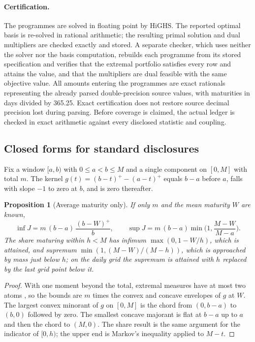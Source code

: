 \documentclass[11pt,a4paper]{article}
\newtheorem{proposition}{Proposition}
\theoremstyle{remark}
\begin{document}
\paragraph{Certification.} The programmes are solved in floating point by HiGHS. The reported optimal basis is re-solved in rational arithmetic; the resulting primal solution and dual multipliers are checked exactly and stored. A separate checker, which uses neither the solver nor the basis computation, rebuilds each programme from its stored specification and verifies that the extremal portfolio satisfies every row and attains the value, and that the multipliers are dual feasible with the same objective value. All amounts entering the programmes are exact rationals representing the already parsed double-precision source values, with maturities in days divided by 365.25. Exact certification does not restore source decimal precision lost during parsing. Before coverage is claimed, the actual ledger is checked in exact arithmetic against every disclosed statistic and coupling.

\subsection{Closed forms for standard disclosures}

Fix a window $[a,b)$ with $0\le a<b\le M$ and a single component on $[0,M]$ with total $m$. The kernel $g(t)=(b-t)^+-(a-t)^+$ equals $b-a$ before $a$, falls with slope $-1$ to zero at $b$, and is zero thereafter.

\begin{proposition}[Average maturity only]\label{prop:wam}
If only $m$ and the mean maturity $W$ are known,
\[
\inf J = m\,(b-a)\,\frac{(b-W)^+}{b},\qquad \sup J = m\,(b-a)\min\!\Big(1,\frac{M-W}{M-a}\Big).
\]
The share maturing within $h<M$ has infimum $\max(0,1-W/h)$, which is attained, and supremum $\min(1,(M-W)/(M-h))$, which is approached by mass just below $h$; on the daily grid the supremum is attained with $h$ replaced by the last grid point below it.
\end{proposition}
\begin{proof}
With one moment beyond the total, extremal measures have at most two atoms \citep{Rogosinski1958,Winkler1988}, so the bounds are $m$ times the convex and concave envelopes of $g$ at $W$. The largest convex minorant of $g$ on $[0,M]$ is the chord from $(0,b-a)$ to $(b,0)$ followed by zero. The smallest concave majorant is flat at $b-a$ up to $a$ and then the chord to $(M,0)$. The share result is the same argument for the indicator of $[0,h)$; the upper end is Markov's inequality applied to $M-t$.
\end{proof}
\end{document}
